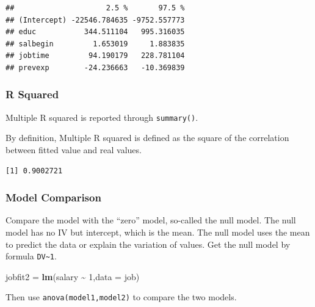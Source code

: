 \documentclass[
]{ctexart}
\newenvironment{Shaded}{\begin{snugshade}}{\end{snugshade}}
\newcommand{\AttributeTok}[1]{\textcolor[rgb]{0.13,0.29,0.53}{#1}}
\newcommand{\DecValTok}[1]{\textcolor[rgb]{0.00,0.00,0.81}{#1}}
\newcommand{\FunctionTok}[1]{\textcolor[rgb]{0.13,0.29,0.53}{\textbf{#1}}}
\newcommand{\NormalTok}[1]{#1}
\newcommand{\OtherTok}[1]{\textcolor[rgb]{0.56,0.35,0.01}{#1}}
\newcommand{\SpecialCharTok}[1]{\textcolor[rgb]{0.81,0.36,0.00}{\textbf{#1}}}
\begin{document}
\begin{verbatim}
##                     2.5 %       97.5 %
## (Intercept) -22546.784635 -9752.557773
## educ           344.511104   995.316035
## salbegin         1.653019     1.883835
## jobtime         94.190179   228.781104
## prevexp        -24.236663   -10.369839
\end{verbatim}

\hypertarget{r-squared-1}{%
\subsubsection{R Squared}\label{r-squared-1}}

Multiple R squared is reported through \texttt{summary()}.

By definition, Multiple R squared is defined as the square of the
correlation between fitted value and real values.

\begin{Shaded}
\end{Shaded}

\begin{verbatim}
[1] 0.9002721
\end{verbatim}

\hypertarget{model-comparison-2}{%
\subsubsection{Model Comparison}\label{model-comparison-2}}

Compare the model with the ``zero'' model, so-called the null model. The
null model has no IV but intercept, which is the mean. The null model
uses the mean to predict the data or explain the variation of values.
Get the null model by formula \texttt{DV\textasciitilde{}1}.

\begin{Shaded}
\begin{Highlighting}[]
\NormalTok{jobfit2 }\OtherTok{=} \FunctionTok{lm}\NormalTok{(salary }\SpecialCharTok{\textasciitilde{}} \DecValTok{1}\NormalTok{,}\AttributeTok{data =}\NormalTok{ job)}
\end{Highlighting}
\end{Shaded}

Then use \texttt{anova(model1,model2)} to compare the two models.
\end{document}
